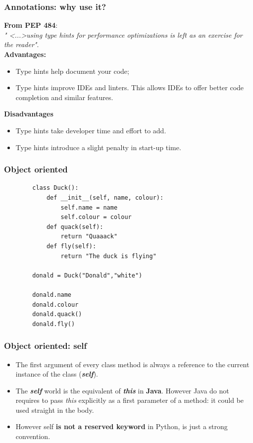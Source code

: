 \documentclass[xcolor ={table,usenames,dvipsnames}]{beamer}
\theoremstyle{definition}
\begin{document}
	\begin{frame}
		\frametitle{Annotations: why use it?}
		\textbf{From PEP 484}:\\
		\textit{" <...>using type hints for performance optimizations is left as an exercise for the reader"}.\\
		
		\textbf{Advantages:}
		\begin{itemize}
			\item Type hints help document your code;
			\item Type hints improve IDEs and linters. This allows IDEs to offer better code completion and similar features.
		\end{itemize}
		\textbf{Disadvantages}
		\begin{itemize}
			\item Type hints take developer time and effort to add.
			\item Type hints introduce a slight penalty in start-up time.
		\end{itemize}
	\end{frame}

	\begin{frame}[fragile]
		\frametitle{Object oriented}
	\begin{lstlisting}
		class Duck():
			def __init__(self, name, colour):
				self.name = name
				self.colour = colour
			def quack(self):
				return "Quaaack"
			def fly(self):
				return "The duck is flying"
		
		donald = Duck("Donald","white")
				
		donald.name
		donald.colour
		donald.quack()
		donald.fly()
		\end{lstlisting}
	\end{frame}

	\begin{frame}[fragile]
		\frametitle{Object oriented: self}
		\begin{itemize}
			\item The first argument of every class method is always a reference to the current instance of the class (\textit{\textbf{self}}).
			\item The \textbf{\textit{self}} world is the equivalent of \textbf{\textit{this}} in \textbf{Java}. However Java do not requires to pass \textit{this} explicitly as a first parameter of a method: it could be used straight in the body.
			\item However self\textbf{ is not a reserved keyword} in Python, is just a strong convention.
		\end{itemize}
	\end{frame}
\end{document}
